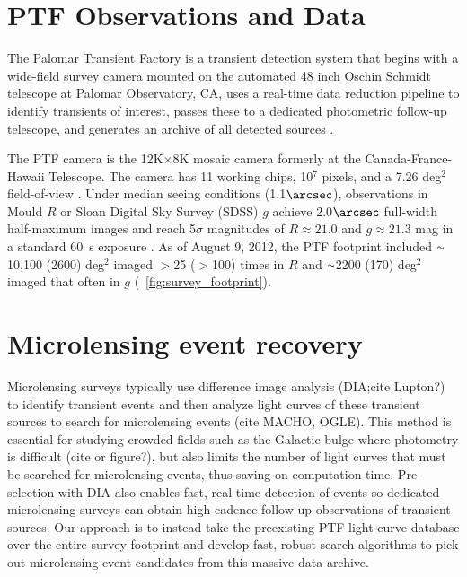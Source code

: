 \documentclass[12pt,preprint]{aastex}
\newcommand{\apwsim}{\raisebox{0.2ex}{\scriptsize$\sim$\normalsize}}
\begin{document}
\section{PTF Observations and Data}
The Palomar Transient Factory is a transient detection system that begins with a wide-field survey camera mounted on the automated 48 inch Oschin Schmidt telescope at Palomar Observatory, CA, uses a real-time data reduction pipeline to identify transients of interest, passes these to a dedicated photometric follow-up telescope, and generates an archive of all detected sources \citep{nick2009,rau2009}.

The PTF camera is the 12K$\times$8K mosaic camera formerly at the Canada-France-Hawaii Telescope. The camera has 11 working chips, 10$^7$ pixels, and a 7.26 deg$^2$ field-of-view \citep{rahmer2008}. Under median seeing conditions (1.1$\arcsec$), observations in Mould $R$ or Sloan Digital Sky Survey (SDSS) $g$ achieve 2.0$\arcsec$ full-width half-maximum images and reach 5$\sigma$ magnitudes of $R \approx 21.0$ and $g \approx 21.3$ mag in a standard 60~s exposure \citep{nick2010}. As of August 9, 2012, the PTF footprint included $\apwsim$10,100 (2600) deg$^2$ imaged $>$25 ($>$100) times in $R$ and $\apwsim$2200 (170) deg$^2$ imaged that often in $g$ (\figurename~\ref{fig:survey_footprint}).

\section{Microlensing event recovery}
Microlensing surveys typically use difference image analysis (DIA;cite Lupton?) to identify transient events and then analyze light curves of these transient sources to search for microlensing events (cite MACHO, OGLE). This method is essential for studying crowded fields such as the Galactic bulge where photometry is difficult (cite or figure?), but also limits the number of light curves that must be searched for microlensing events, thus saving on computation time. Pre-selection with DIA also enables fast, real-time detection of events so dedicated microlensing surveys can obtain high-cadence follow-up observations of transient sources. Our approach is to instead take the preexisting PTF light curve database over the entire survey footprint and develop fast, robust search algorithms to pick out microlensing event candidates from this massive data archive. 
\end{document}
